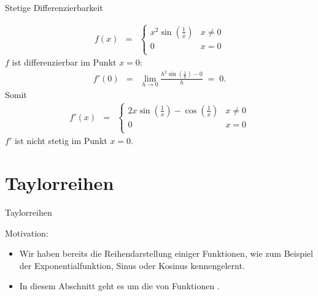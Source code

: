 \documentclass[german]{beamer}
\newcommand{\bq}{\begin{eqnarray*}}
\newcommand{\eq}{\end{eqnarray*}}
\newcommand{\superalert}[1]{{\color{MyYellowOrange}{#1}}}
\begin{document}
\begin{frame}{Stetige Differenzierbarkeit}

\begin{example}
\bq
 f\left(x\right)
 & = &
 \left\{ \begin{array}{ll}
 x^2 \sin\left(\frac{1}{x}\right) & x \neq 0 \\
 0 & x=0 \\
 \end{array} \right.
\eq
$f$ ist differenzierbar im Punkt $x=0$:
\bq
 f'\left(0\right) 
 & = &
 \lim\limits_{h \rightarrow 0} \frac{h^2 \sin\left(\frac{1}{h}\right) - 0}{h} \; = \; 0.
\eq
Somit
\bq
 f'\left(x\right)
 & = &
 \left\{ \begin{array}{ll}
 2 x \sin\left(\frac{1}{x}\right) - \cos\left(\frac{1}{x}\right) & x \neq 0 \\
 0 & x=0 \\
 \end{array} \right.
\eq
$f'$ ist nicht stetig im Punkt $x=0$.
\end{example}

\end{frame}


\section{Taylorreihen}

\frame{\sectionpage}

\begin{frame}{Taylorreihen}

Motivation:
\begin{itemize}
\item Wir haben bereits die \alert{Reihendarstellung} einiger Funktionen, wie zum Beispiel der Exponentialfunktion,
Sinus oder Kosinus kennengelernt.
\item In diesem Abschnitt geht es um die \superalert{systematische Entwicklung} von Funktionen \superalert{in Potenzreihen}.
\end{itemize}

\end{frame}
\end{document}
